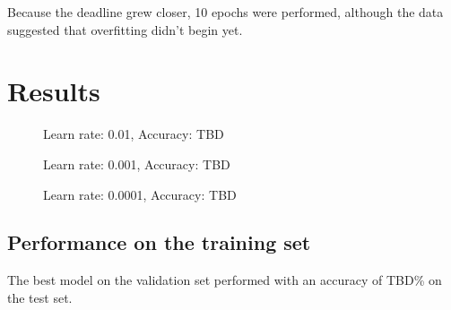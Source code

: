 \documentclass[10pt, a4paper]{scrartcl}
\begin{document}
Because the deadline grew closer, 10 epochs were performed, although the data
suggested that overfitting didn't begin yet.

\section{Results}
\begin{figure}[!htbp]
  \centering
  \caption{Learn rate: 0.01, Accuracy: TBD}
  \label{fig:lr_0.01}
\end{figure}

\begin{figure}[!htbp]
  \centering
  \caption{Learn rate: 0.001, Accuracy: TBD}
  \label{fig:lr_0.001}
\end{figure}

\begin{figure}[!htbp]
  \centering
  \caption{Learn rate: 0.0001, Accuracy: TBD}
  \label{fig:lr_0.001}
\end{figure}

\subsection{Performance on the training set}
The best model on the validation set performed with an accuracy of TBD\% on the
test set.
\end{document}
